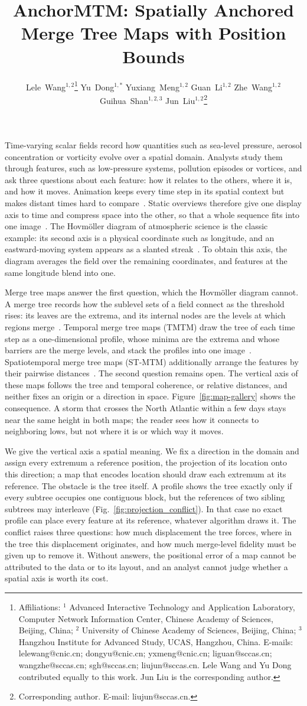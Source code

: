 \documentclass[preprint]{vgtc}   %
\title{AnchorMTM: Spatially Anchored Merge Tree Maps with Position Bounds}
\author{%
Lele~Wang$^{1,2}$\thanks{%
Affiliations:
$^{1}$ Advanced Interactive Technology and Application Laboratory, Computer Network Information Center, Chinese Academy of Sciences, Beijing, China;
$^{2}$ University of Chinese Academy of Sciences, Beijing, China;
$^{3}$ Hangzhou Institute for Advanced Study, UCAS, Hangzhou, China.
E-mails: lelewang@cnic.cn; dongyu@cnic.cn; yxmeng@cnic.cn;
liguan@sccas.cn; wangzhe@sccas.cn; sgh@sccas.cn;
liujun@sccas.cn.
Lele Wang and Yu Dong contributed equally to this work.
Jun Liu is the corresponding author.}%
\quad
Yu~Dong$^{1,*}$%
\quad
Yuxiang~Meng$^{1,2}$%
\quad
Guan~Li$^{1,2}$%
\quad
Zhe~Wang$^{1,2}$%
\quad
Guihua~Shan$^{1,2,3}$%
\quad
Jun~Liu$^{1,2}$\thanks{Corresponding author. E-mail: liujun@sccas.cn.}
}
\begin{document}
\maketitle
\raggedbottom
\setlength{\emergencystretch}{1.5em}
Time-varying scalar fields record how quantities such as sea-level pressure, aerosol concentration or vorticity evolve over a spatial domain. Analysts study them through features, such as low-pressure systems, pollution episodes or vortices, and ask three questions about each feature: how it relates to the others, where it is, and how it moves. Animation keeps every time step in its spatial context but makes distant times hard to compare~\cite{Tversky:2002:Animation,Robertson:2008:Animation}. Static overviews therefore give one display axis to time and compress space into the other, so that a whole sequence fits into one image~\cite{Bach:2017:STC}. The Hovm\"oller diagram of atmospheric science is the classic example: its second axis is a physical coordinate such as longitude, and an eastward-moving system appears as a slanted streak~\cite{Hovmoller:1949}. To obtain this axis, the diagram averages the field over the remaining coordinates, and features at the same longitude blend into one.

Merge tree maps answer the first question, which the Hovm\"oller diagram cannot. A merge tree records how the sublevel sets of a field connect as the threshold rises: its leaves are the extrema, and its internal nodes are the levels at which regions merge~\cite{Heine:2016:Survey}. Temporal merge tree maps (TMTM) draw the tree of each time step as a one-dimensional profile, whose minima are the extrema and whose barriers are the merge levels, and stack the profiles into one image~\cite{Koepp:2023:TMTM}. Spatiotemporal merge tree maps (ST-MTM) additionally arrange the features by their pairwise distances~\cite{STMTM:2026}. The second question remains open. The vertical axis of these maps follows the tree and temporal coherence, or relative distances, and neither fixes an origin or a direction in space. Figure~\ref{fig:map-gallery} shows the consequence. A storm that crosses the North Atlantic within a few days stays near the same height in both maps; the reader sees how it connects to neighboring lows, but not where it is or which way it moves.

We give the vertical axis a spatial meaning. We fix a direction in the domain and assign every extremum a reference position, the projection of its location onto this direction; a map that encodes location should draw each extremum at its reference. The obstacle is the tree itself. A profile shows the tree exactly only if every subtree occupies one contiguous block, but the references of two sibling subtrees may interleave (Fig.~\ref{fig:projection_conflict}). In that case no exact profile can place every feature at its reference, whatever algorithm draws it. The conflict raises three questions: how much displacement the tree forces, where in the tree this displacement originates, and how much merge-level fidelity must be given up to remove it. Without answers, the positional error of a map cannot be attributed to the data or to its layout, and an analyst cannot judge whether a spatial axis is worth its cost.
\end{document}
